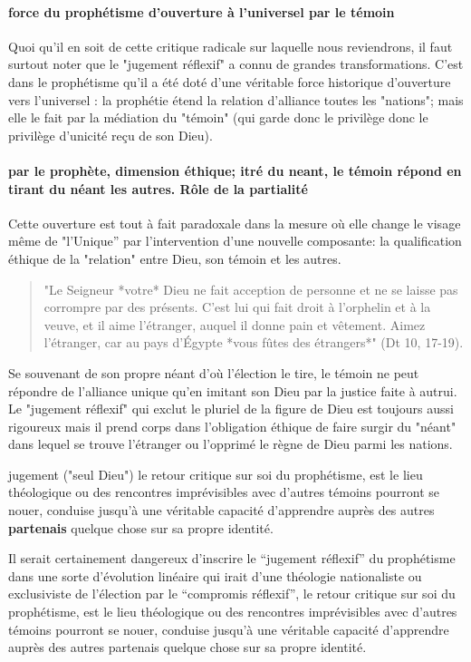 \paragraph{force du prophétisme d'ouverture à l'universel par le témoin}
Quoi qu'il en soit de cette critique radicale sur laquelle nous reviendrons, il faut surtout noter que le "jugement réflexif" a connu de grandes transformations. C'est dans le prophétisme qu'il a été doté d'une véritable force historique d'ouverture vers l'universel : la prophétie étend la relation d'alliance toutes les "nations"; mais elle le fait par la médiation du "témoin" (qui garde donc le privilège donc le privilège d'unicité reçu de son Dieu). 
\paragraph{par le prophète, dimension éthique; itré du neant, le témoin répond en tirant du néant les autres. Rôle de la partialité}
Cette ouverture est tout à fait paradoxale dans la mesure où elle change le visage même de "l'Unique” par l'intervention d'une nouvelle composante: la qualification éthique de la "relation" entre Dieu, son témoin et les autres. \label{Dt10Prophete} \begin{quote}
    "Le Seigneur *votre* Dieu ne fait acception de personne et ne se laisse pas corrompre par des présents. C'est lui qui fait droit à l'orphelin et à la veuve, et il aime l'étranger, auquel il donne pain et vêtement. Aimez l'étranger, car au pays d'Égypte *vous fûtes des étrangers*" (Dt 10, 17-19).
\end{quote} 
Se souvenant de son propre néant d'où l'élection le tire, le témoin ne peut répondre de l'alliance unique qu'en imitant son Dieu par la justice faite à autrui. Le "jugement réflexif" qui exclut le pluriel de la figure de Dieu est toujours aussi rigoureux mais il prend corps dans l’obligation éthique de faire surgir du "néant" dans lequel se trouve l'étranger ou l'opprimé le règne de Dieu parmi les nations.

\begin{Def}
    jugement ("seul Dieu") le retour critique sur soi du prophétisme, est le lieu théologique ou des rencontres imprévisibles avec d'autres témoins pourront se nouer, conduise jusqu'à une véritable capacité d'apprendre auprès des autres \textbf{partenais} quelque chose sur sa propre identité.
\end{Def}
Il serait certainement dangereux d’inscrire le “jugement réflexif” du prophétisme dans une sorte d’évolution linéaire qui irait d’une théologie nationaliste ou exclusiviste de l’élection par le “compromis réflexif”, le retour critique sur soi du prophétisme, est le lieu théologique ou des rencontres imprévisibles avec d'autres témoins pourront se nouer, conduise jusqu'à une véritable capacité d'apprendre auprès des autres partenais quelque chose sur sa propre identité.

